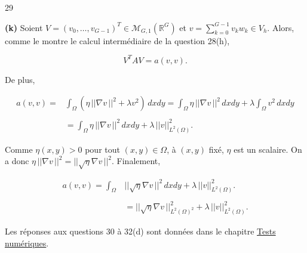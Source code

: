 
\begin{reponse}{29}

\textbf{(k)} Soient $V = (v_0,\dots, v_{G-1})^T \in \mathcal{M}_{G,1}\left(\mathbb{R}^G\right)$ et $v = \sum\limits_{k=0}^{G-1} v_kw_k \in V_h$. Alors, comme le montre le calcul intermédiaire de la question 28(h),

\[
    V^TAV = a(v,v).
\]

De plus,

\begin{align*}
    a(v,v) = & \int_\Omega (\eta \, \vert \vert \nabla v \, \vert \vert ^2 + \lambda v^2) \, dxdy = \int_\Omega \eta \, \vert \vert \nabla v \, \vert \vert ^2 \, dxdy + \lambda \int_\Omega v^2 \, dxdy \\ \\
    & = \int_\Omega \eta \, \vert \vert \nabla v \, \vert \vert ^2 \, dxdy+ \lambda \, \vert \vert v \vert \vert _{L^2(\Omega)}^2.
\end{align*}

Comme $\eta (x,y) >0$ pour tout $(x,y) \in \Omega$, à $(x,y)$ fixé, $\eta$ est un scalaire. On a donc $\eta \, \vert \vert \nabla v \, \vert \vert ^2= \vert \vert \sqrt{\eta}\nabla v \, \vert \vert ^2$. Finalement,

\begin{align*}
    a(v,v) = \int_\Omega & \vert \vert \sqrt{\eta}\nabla v \, \vert \vert ^2 \, dxdy+ \lambda \, \vert \vert v \vert \vert _{L^2(\Omega)}^2. \\ \\
    & = \vert \vert \sqrt{\eta}\nabla v \, \vert \vert _{L^2(\Omega)^2}^2+ \lambda \, \vert \vert v \vert \vert _{L^2(\Omega)}^2.
\end{align*}
\end{reponse}

\begin{remark*}

    Les réponses aux questions 30 à 32(d) sont données dans le chapitre \hyperref[sec:testnum]{Tests numériques}.

\end{remark*}